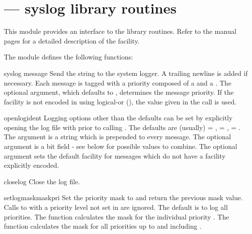 \section{ ---
         \UNIX{} syslog library routines}



This module provides an interface to the \UNIX{}  library
routines.  Refer to the \UNIX{} manual pages for a detailed description
of the  facility.

The module defines the following functions:


\begin{funcdesc}{syslog}{ message}
Send the string  to the system logger.  A trailing
newline is added if necessary.  Each message is tagged with a priority
composed of a  and a .  The optional
 argument, which defaults to ,
determines the message priority.  If the facility is not encoded in
 using logical-or (), the
value given in the  call is used.
\end{funcdesc}

\begin{funcdesc}{openlog}{ident}
Logging options other than the defaults can be set by explicitly
opening the log file with  prior to calling
.  The defaults are (usually)  =
,  = ,  =
.  The  argument is a string which is
prepended to every message.  The optional  argument is a
bit field - see below for possible values to combine.  The optional
 argument sets the default facility for messages which
do not have a facility explicitly encoded.
\end{funcdesc}

\begin{funcdesc}{closelog}{}
Close the log file.
\end{funcdesc}

\begin{funcdesc}{setlogmask}{maskpri}
Set the priority mask to  and return the
previous mask value.  Calls to  with a priority
level not set in  are ignored.  The default is to log all
priorities.  The function  calculates the
mask for the individual priority .  The function
 calculates the mask for all priorities up
to and including .
\end{funcdesc}


